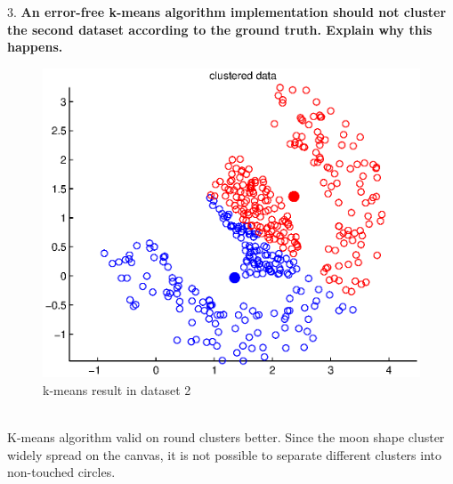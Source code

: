 \documentclass[12pt]{article}
\begin{document}
	\noindent
	3. \textbf{An error-free k-means algorithm implementation should not cluster the second dataset according to the ground truth. Explain why this happens.}\\
	\noindent
	\begin{figure}[htbp]
		\centering
		\includegraphics[scale=.7]{dataset2_1}
		\caption{k-means result in dataset 2}
		\label{fig:dataset2}
	\end{figure}
	\\
	\noindent
	K-means algorithm valid on round clusters better. Since the moon shape cluster widely spread on the canvas, it is not possible to separate different clusters into non-touched circles.\\
\end{document}
